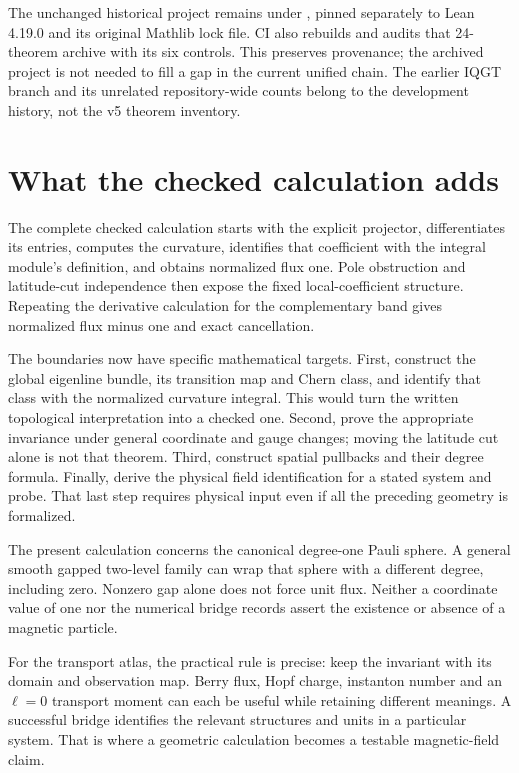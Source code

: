 \documentclass[11pt]{article}
\theoremstyle{definition}\newtheorem{definition}[theorem]{Definition}
\theoremstyle{remark}\newtheorem{remark}[theorem]{Remark}
\newcommand{\leanname}[1]{\texttt{\small\detokenize{#1}}}
\begin{document}
The unchanged historical project remains under \leanname{monopole_stance/}, pinned separately to Lean 4.19.0 and its original Mathlib lock file. CI also rebuilds and audits that 24-theorem archive with its six controls. This preserves provenance; the archived project is not needed to fill a gap in the current unified chain. The earlier IQGT branch and its unrelated repository-wide counts belong to the development history, not the v5 theorem inventory.

\section{What the checked calculation adds}
The complete checked calculation starts with the explicit projector, differentiates its entries, computes the curvature, identifies that coefficient with the integral module's definition, and obtains normalized flux one. Pole obstruction and latitude-cut independence then expose the fixed local-coefficient structure. Repeating the derivative calculation for the complementary band gives normalized flux minus one and exact cancellation.

The boundaries now have specific mathematical targets. First, construct the global eigenline bundle, its transition map and Chern class, and identify that class with the normalized curvature integral. This would turn the written topological interpretation into a checked one. Second, prove the appropriate invariance under general coordinate and gauge changes; moving the latitude cut alone is not that theorem. Third, construct spatial pullbacks and their degree formula. Finally, derive the physical field identification for a stated system and probe. That last step requires physical input even if all the preceding geometry is formalized.

The present calculation concerns the canonical degree-one Pauli sphere. A general smooth gapped two-level family can wrap that sphere with a different degree, including zero. Nonzero gap alone does not force unit flux. Neither a coordinate value of one nor the numerical bridge records assert the existence or absence of a magnetic particle.

For the transport atlas, the practical rule is precise: keep the invariant with its domain and observation map. Berry flux, Hopf charge, instanton number and an $\ell=0$ transport moment can each be useful while retaining different meanings. A successful bridge identifies the relevant structures and units in a particular system. That is where a geometric calculation becomes a testable magnetic-field claim.
\end{document}

